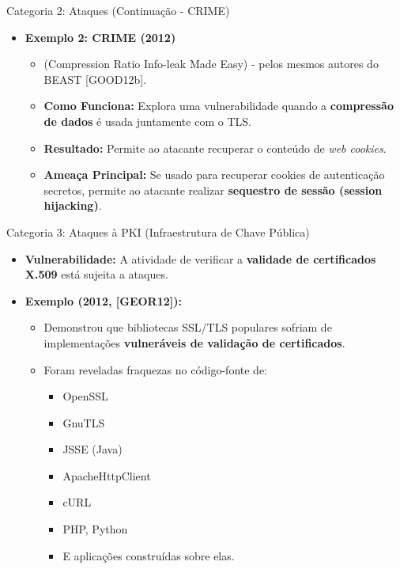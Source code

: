 \begin{frame}{Categoria 2: Ataques (Continuação - CRIME)}
    \begin{itemize}
        \item \textbf{Exemplo 2: CRIME (2012)}
              \begin{itemize}
                  \item (Compression Ratio Info-leak Made Easy) - pelos mesmos autores do BEAST [GOOD12b].
                  \item \textbf{Como Funciona:} Explora uma vulnerabilidade quando a \textbf{compressão de dados} é usada juntamente com o TLS.
                  \item \textbf{Resultado:} Permite ao atacante recuperar o conteúdo de \textit{web cookies}.
                  \item \textbf{Ameaça Principal:} Se usado para recuperar cookies de autenticação secretos, permite ao atacante realizar \textbf{sequestro de sessão (session hijacking)}.
              \end{itemize}
    \end{itemize}
\end{frame}

\begin{frame}{Categoria 3: Ataques à PKI (Infraestrutura de Chave Pública)}
    \begin{itemize}
        \item \textbf{Vulnerabilidade:} A atividade de verificar a \textbf{validade de certificados X.509} está sujeita a ataques.

        \item \textbf{Exemplo (2012, [GEOR12]):}
              \begin{itemize}
                  \item Demonstrou que bibliotecas SSL/TLS populares sofriam de implementações \textbf{vulneráveis de validação de certificados}.
                  \item Foram reveladas fraquezas no código-fonte de:
                        \begin{itemize}
                            \item OpenSSL
                            \item GnuTLS
                            \item JSSE (Java)
                            \item ApacheHttpClient
                            \item cURL
                            \item PHP, Python
                            \item E aplicações construídas sobre elas.
                        \end{itemize}
              \end{itemize}
    \end{itemize}
\end{frame}

